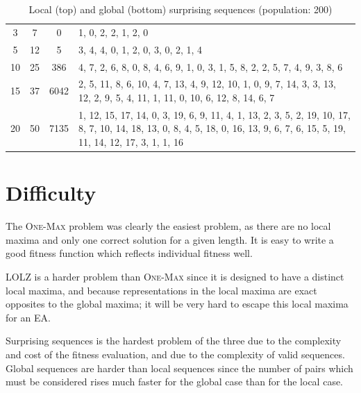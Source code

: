 \documentclass[paper=a4, fontsize=10pt]{scrartcl} %
\begin{document}
\begin{table}
{\begin{tabularx}{\textwidth}{cccX}
\midrule
3 & 7 & 0 & 1, 0, 2, 2, 1, 2, 0 \\
5 & 12 & 5 & 3, 4, 4, 0, 1, 2, 0, 3, 0, 2, 1, 4 \\
10 & 25 & 386 & 4, 7, 2, 6, 8, 0, 8, 4, 6, 9, 1, 0, 3, 1, 5, 8, 2, 2, 5, 7, 4, 9, 3, 8, 6 \\
15 & 37 & 6042 & 2, 5, 11, 8, 6, 10, 4, 7, 13, 4, 9, 12, 10, 1, 0, 9, 7, 14, 3, 3, 13, 12, 2, 9, 5, 4, 11, 1, 11, 0, 10, 6, 12, 8, 14, 6, 7 \\
20 & 50 & 7135 & 1, 12, 15, 17, 14, 0, 3, 19, 6, 9, 11, 4, 1, 13, 2, 3, 5, 2, 19, 10, 17, 8, 7, 10, 14, 18, 13, 0, 8, 4, 5, 18, 0, 16, 13, 9, 6, 7, 6, 15, 5, 19, 11, 14, 12, 17, 3, 1, 1, 16 \\
\bottomrule
\end{tabularx}
}
\caption{Local (top) and global (bottom) surprising sequences (population: 200)}
\label{table:surprising}
\end{table}

\vspace{-0.35cm}
\section*{Difficulty}

\setlength\parindent{17pt}
The \textsc{One-Max} problem was clearly the easiest problem, as there are no local maxima and only one correct solution for a given length. It is easy to write a good fitness function which reflects individual fitness well.

\textsc{LOLZ} is a harder problem than \textsc{One-Max} since it is designed to have a distinct local maxima, and because representations in the local maxima are exact opposites to the global maxima; it will be very hard to escape this local maxima for an \ac{EA}.

Surprising sequences is the hardest problem of the three due to the complexity and cost of the fitness evaluation, and due to the complexity of valid sequences. Global sequences are harder than local sequences since the number of pairs which must be considered rises much faster for the global case than for the local case.
\setlength\parindent{0pt}
\end{document}
